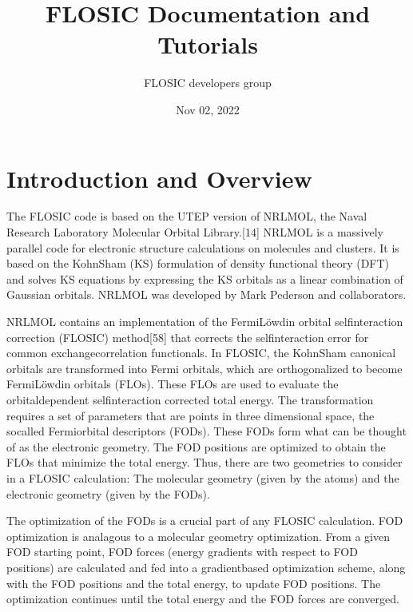 \documentclass[letterpaper,10pt,english,openany,oneside]{sphinxmanual}
\title{FLOSIC Documentation and Tutorials }
\date{Nov 02, 2022}
\author{  FLOSIC developers group }
\begin{document}
\pagestyle{empty}
\sphinxmaketitle
\pagestyle{plain}
\sphinxtableofcontents
\pagestyle{normal}
\label{\detokenize{main::doc}}



\chapter{Introduction and Overview}
\label{\detokenize{index:introduction-and-overview}}\label{\detokenize{index:formatting-text}}\label{\detokenize{index::doc}}
\sphinxAtStartPar
The FLOSIC code is based on the UTEP version of NRLMOL, the Naval Research
Laboratory Molecular Orbital Library.{[}1\sphinxhyphen{}4{]}
NRLMOL is a massively parallel code for electronic structure calculations on molecules and clusters.
It is based on the Kohn\sphinxhyphen{}Sham (KS) formulation of density functional theory (DFT) and solves KS equations by expressing
the KS orbitals as a linear combination of Gaussian orbitals. NRLMOL was developed by Mark Pederson and collaborators.

\sphinxAtStartPar
NRLMOL contains an implementation of the Fermi\sphinxhyphen{}Löwdin orbital self\sphinxhyphen{}interaction correction (FLO\sphinxhyphen{}SIC) method{[}5\sphinxhyphen{}8{]}
that corrects the self\sphinxhyphen{}interaction error for common exchange\sphinxhyphen{}correlation functionals.
In FLO\sphinxhyphen{}SIC, the Kohn\sphinxhyphen{}Sham canonical orbitals are transformed into Fermi orbitals, which are orthogonalized to become Fermi\sphinxhyphen{}Löwdin orbitals (FLOs).
These FLOs are used to evaluate the orbital\sphinxhyphen{}dependent self\sphinxhyphen{}interaction corrected total energy. The transformation requires
a set of parameters that are points in three dimensional space, the so\sphinxhyphen{}called
Fermi\sphinxhyphen{}orbital descriptors (FODs). These FODs form what can be thought of as the electronic geometry.
The FOD positions are optimized to obtain the FLOs that minimize the total energy.
Thus, there are two geometries to consider in a FLOSIC calculation: The molecular geometry (given by the atoms) and the electronic geometry (given by the FODs).

\sphinxAtStartPar
The optimization of the FODs is a crucial part of any FLO\sphinxhyphen{}SIC calculation.
FOD optimization is analagous to a molecular geometry optimization. From a given FOD starting point,
FOD forces (energy gradients with respect to FOD positions)
are calculated and fed into a gradient\sphinxhyphen{}based optimization scheme,
along with the FOD positions and the total energy, to update FOD positions.
The optimization continues until the total energy and the FOD forces are converged.
\end{document}
